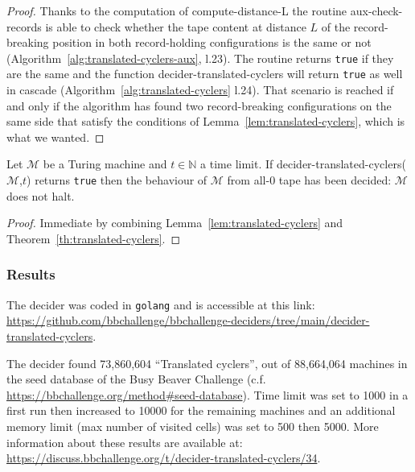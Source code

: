 \begin{proof}
  Thanks to the computation of {\sc compute-distance-L} the routine {\sc aux-check-records} is able to check whether the tape content at distance $L$ of the record-breaking position in both record-holding configurations is the same or not (Algorithm~\ref{alg:translated-cyclers-aux}, l.23). The routine returns \texttt{true} if they are the same and the function {\sc decider-translated-cyclers} will return \texttt{true} as well in cascade (Algorithm~\ref{alg:translated-cyclers} l.24). That scenario is reached if and only if the algorithm has found two record-breaking configurations on the same side that satisfy the conditions of Lemma~\ref{lem:translated-cyclers}, which is what we wanted.
\end{proof}

\begin{corollary}
  Let $\mathcal{M}$ be a Turing machine and $t \in \mathbb{N}$ a time limit. If {\sc decider-translated-cyclers}($\mathcal{M}$,$t$) returns \texttt{true} then the behaviour of $\mathcal{M}$ from all-0 tape has been decided: $\mathcal{M}$ does not halt.
\end{corollary}
\begin{proof}
  Immediate by combining Lemma~\ref{lem:translated-cyclers} and Theorem~\ref{th:translated-cyclers}.
\end{proof}

\subsubsection{Results}

The decider was coded in \texttt{golang} and is accessible at this link: \url{https://github.com/bbchallenge/bbchallenge-deciders/tree/main/decider-translated-cyclers}.

The decider found 73,860,604 ``Translated cyclers'', out of 88,664,064 machines in the seed database of the Busy Beaver Challenge (c.f. \url{https://bbchallenge.org/method#seed-database}). Time limit was set to 1000 in a first run then increased to 10000 for the remaining machines and an additional memory limit (max number of visited cells) was set to 500 then 5000. More information about these results are available at: \url{https://discuss.bbchallenge.org/t/decider-translated-cyclers/34}.
